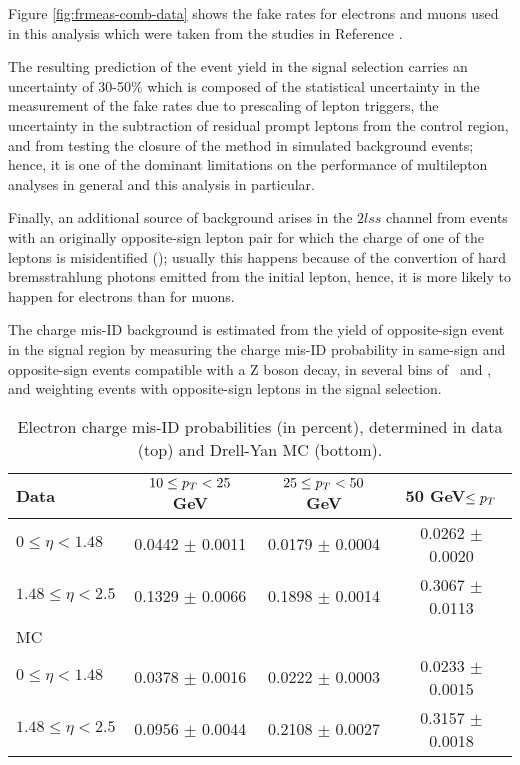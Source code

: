 Figure \ref{fig:frmeas-comb-data} shows the fake rates for electrons and muons used in this analysis which were taken from the studies in Reference \cite{CMS_AN_2017-029}.

The resulting prediction of the event yield in the signal selection carries an uncertainty of 30-50\% which is composed of the statistical uncertainty in the measurement of the fake rates due to prescaling of lepton triggers, the uncertainty in the subtraction of residual prompt leptons from the control region, and from testing the closure of the method in simulated background events; hence, it is one of the dominant limitations on the performance of multilepton analyses in general and this analysis in particular.

Finally, an additional source of background arises in the $2lss$ channel from events with an originally opposite-sign lepton pair for which the charge of one of the leptons is misidentified (); usually this happens because of the convertion of hard bremsstrahlung photons emitted from the initial lepton, hence, it is more likely to happen for electrons than for muons.

The charge mis-ID background is estimated from the yield of opposite-sign event in the signal region by measuring the charge mis-ID probability in same-sign and opposite-sign events compatible with a Z boson decay, in several bins of \pt\ and \etac, and weighting events with opposite-sign leptons in the signal selection.

\begin{table}[htp]
\centering
\begin{tabular}{lccc}\hline
 Data                & $10\leq p_T<25$ GeV  & $25\leq p_T<50$ GeV  & 50 GeV$\leq p_T$ \\\hline
$0\leq\eta<1.48$     & 0.0442 $\pm$ 0.0011 & 0.0179 $\pm$ 0.0004 & 0.0262 $\pm$ 0.0020 \\
$1.48\leq\eta<2.5$   & 0.1329 $\pm$ 0.0066 & 0.1898 $\pm$ 0.0014 & 0.3067 $\pm$ 0.0113 \\\hline
 MC                  &                     &                     &                      \\\hline
$0\leq\eta<1.48$     & 0.0378 $\pm$ 0.0016 & 0.0222 $\pm$ 0.0003 & 0.0233 $\pm$ 0.0015 \\
$1.48\leq\eta<2.5$   & 0.0956 $\pm$ 0.0044 & 0.2108 $\pm$ 0.0027 & 0.3157 $\pm$ 0.0018 \\\hline
\end{tabular}
\caption[Electron charge mis-ID probabilities.]{Electron charge mis-ID probabilities (in percent), determined in data (top) and Drell-Yan MC (bottom)\cite{CMS_AN_2017-029}.}
\label{tab:chmisid_prob}
\end{table}

